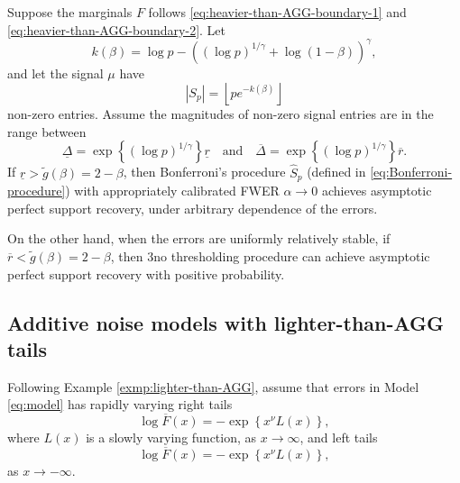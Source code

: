 \begin{theorem} \label{thm:heavier-than-AGG}
Suppose the marginals $F$ follows \eqref{eq:heavier-than-AGG-boundary-1} and \eqref{eq:heavier-than-AGG-boundary-2}.
Let
$$
k(\beta) = \log{p} - \left((\log{p})^{1/\gamma} + \log{(1-\beta)}\right)^\gamma,
$$
and let the signal $\mu$ have 
$$|S_p| = \left\lfloor pe^{-k(\beta)} \right\rfloor$$
non-zero entries. Assume the magnitudes of non-zero signal entries are in the range between
$$\underline{\Delta} = \exp{\left\{(\log{p})^{1/\gamma}\right\}}\underline{r}
\quad\text{and}\quad
\overline{\Delta} = \exp{\left\{(\log{p})^{1/\gamma}\right\}}\overline{r}.$$
If $\underline{r} > \widetilde{g}(\beta) = 2 - \beta$, then Bonferroni's procedure $\widehat{S}_p$ (defined in \eqref{eq:Bonferroni-procedure}) with appropriately calibrated FWER $\alpha\to 0$ achieves asymptotic perfect support recovery, under arbitrary dependence of the errors.

On the other hand, when the errors are uniformly relatively stable, if $\overline{r} < \widetilde{g}(\beta) = 2 - \beta$, then 3no thresholding procedure can achieve asymptotic perfect support recovery with positive probability.
\end{theorem}


\subsection{Additive noise models with lighter-than-AGG tails}
Following Example \ref{exmp:lighter-than-AGG}, assume that errors in Model \eqref{eq:model} has rapidly varying right tails
\begin{equation} \label{eq:lighter-than-AGG-boundary-1}
        \log{\overline{F}(x)} = - \exp{\left\{x^\nu L(x)\right\}},
\end{equation}
where $L(x)$ is a slowly varying function, as $x\to\infty$, and left tails
\begin{equation} \label{eq:lighter-than-AGG-boundary-2}
        \log{\overline{F}(x)} = - \exp{\left\{x^\nu L(x)\right\}},
\end{equation}
as $x\to -\infty$.

